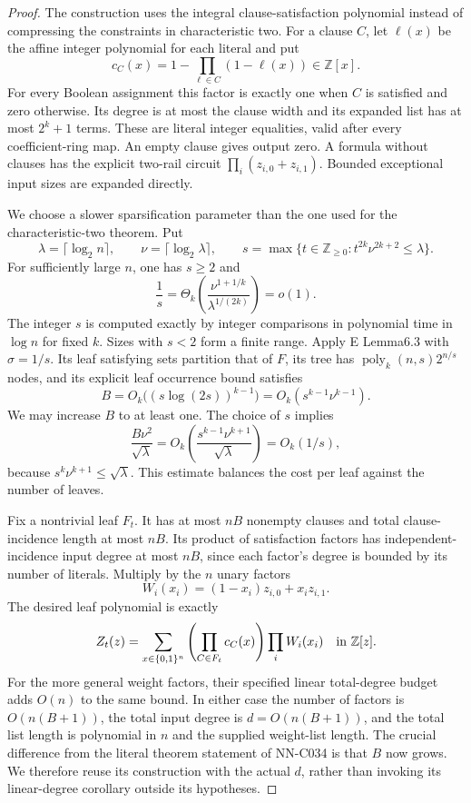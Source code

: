 \begin{proof}
The construction uses the integral clause-satisfaction polynomial instead of compressing the constraints in characteristic two. For a clause $C$, let $\ell(x)$ be the affine integer polynomial for each literal and put
\[
                   c_C(x)=1-\prod_{\ell\in C}(1-\ell(x))\in\mathbb Z[x].
\]
For every Boolean assignment this factor is exactly one when $C$ is satisfied and zero otherwise. Its degree is at most the clause width and its expanded list has at most $2^k+1$ terms. These are literal integer equalities, valid after every coefficient-ring map. An empty clause gives output zero. A formula without clauses has the explicit two-rail circuit $\prod_i(z_{i,0}+z_{i,1})$. Bounded exceptional input sizes are expanded directly.

We choose a slower sparsification parameter than the one used for the characteristic-two theorem. Put
\[
 \lambda=\lceil\log_2 n\rceil,\qquad
 \nu=\lceil\log_2\lambda\rceil,
 \qquad s=\max\{t\in\mathbb Z_{\ge0}:t^{2k}\nu^{2k+2}\le\lambda\}.
\]
For sufficiently large $n$, one has $s\ge2$ and
\[
 \frac1s=\Theta_k\!\left(
             \frac{\nu^{1+1/k}}{\lambda^{1/(2k)}}\right)=o(1).
\]
The integer $s$ is computed exactly by integer comparisons in polynomial time in $\log n$ for fixed $k$. Sizes with $s<2$ form a finite range. Apply E Lemma6.3 with $\sigma=1/s$. Its leaf satisfying sets partition that of $F$, its tree has $\operatorname{poly}_k(n,s)2^{n/s}$ nodes, and its explicit leaf occurrence bound satisfies
\[
 B=O_k\bigl((s\log(2s))^{k-1}\bigr)
       =O_k(s^{k-1}\nu^{k-1}).
\]
We may increase $B$ to at least one. The choice of $s$ implies
\begin{equation}\label{eq:C036-balance}
     \frac{B\nu^2}{\sqrt\lambda}
       =O_k\!\left(\frac{s^{k-1}\nu^{k+1}}{\sqrt\lambda}\right)
       =O_k(1/s),
\end{equation}
because $s^k\nu^{k+1}\le\sqrt\lambda$. This estimate balances the cost per leaf against the number of leaves.

Fix a nontrivial leaf $F_t$. It has at most $nB$ nonempty clauses and total clause-incidence length at most $nB$. Its product of satisfaction factors has independent-incidence input degree at most $nB$, since each factor's degree is bounded by its number of literals. Multiply by the $n$ unary factors
\[
                       W_i(x_i)=(1-x_i)z_{i,0}+x_i z_{i,1}.
\]
The desired leaf polynomial is exactly
\[
 Z_t(z)=\sum_{x\in\{0,1\}^n}\left(\prod_{C\in F_t}c_C(x)\right)
                                      \prod_iW_i(x_i)
                          \quad\hbox{in }\mathbb Z[z].
\]
For the more general weight factors, their specified linear total-degree budget adds $O(n)$ to the same bound. In either case the number of factors is $O(n(B+1))$, the total input degree is $d=O(n(B+1))$, and the total list length is polynomial in $n$ and the supplied weight-list length. The crucial difference from the literal theorem statement of NN-C034 is that $B$ now grows. We therefore reuse its construction with the actual $d$, rather than invoking its linear-degree corollary outside its hypotheses.


\end{proof}
